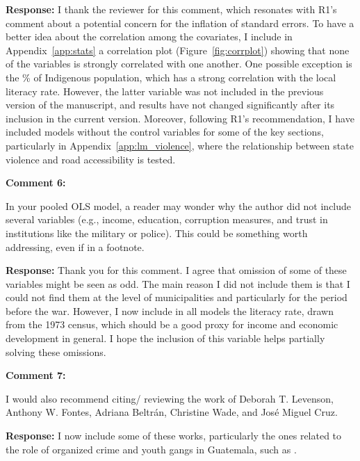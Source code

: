\documentclass[12pt, a4paper, notitlepage]{article}
\begin{document}
\noindent\textbf{Response:} I thank the reviewer for this comment, which resonates with R1's comment about a potential concern for the inflation of standard errors. To have a better idea about the correlation among the covariates, I include in Appendix~\ref{app:stats} a correlation plot (Figure~\ref{fig:corrplot}) showing that none of the variables is strongly correlated with one another. One possible exception is the \% of Indigenous population, which has a strong correlation with the local literacy rate. However, the latter variable was not included in the previous version of the manuscript, and results have not changed significantly after its inclusion in the current version.
Moreover, following R1's recommendation, I have included models without the control variables for some of the key sections, particularly in Appendix~\ref{app:lm_violence}, where the relationship between state violence and road accessibility is tested.

\vspace{15pt}
\noindent\textbf{Comment 6:}
\begin{displayquote}
In your pooled OLS model, a reader may wonder why the author did not include several variables (e.g., income, education, corruption measures, and trust in institutions like the military or police). This could be something worth addressing, even if in a footnote.
\end{displayquote}

\noindent\textbf{Response:} Thank you for this comment. I agree that omission of some of these variables might be seen as odd. The main reason I did not include them is that I could not find them at the level of municipalities and particularly for the period before the war. However, I now include in all models the literacy rate, drawn from the 1973 census, which should be a good proxy for income and economic development in general. I hope the inclusion of this variable helps partially solving these omissions.

\vspace{15pt}
\noindent\textbf{Comment 7:}
\begin{displayquote}
I would also recommend citing/ reviewing the work of Deborah T. Levenson, Anthony W. Fontes, Adriana Beltrán, Christine Wade, and José Miguel Cruz.
\end{displayquote}

\noindent\textbf{Response:} I now include some of these works, particularly the ones related to the role of organized crime and youth gangs in Guatemala, such as \citet{Peacock:2003tt, Beltran:2016td, Booth:2010wd, Levenson:2013tm}.

\newpage


\end{document}
